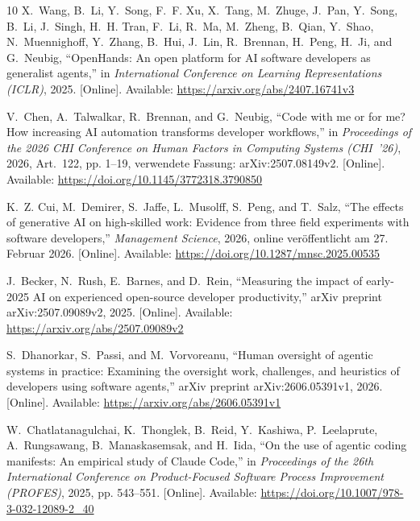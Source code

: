 \documentclass[conference]{IEEEtran}
\begin{document}
\begin{thebibliography}{10}
\BIBentryALTinterwordspacing
X.~Wang, B.~Li, Y.~Song, F.~F. Xu, X.~Tang, M.~Zhuge, J.~Pan, Y.~Song, B.~Li,
  J.~Singh, H.~H. Tran, F.~Li, R.~Ma, M.~Zheng, B.~Qian, Y.~Shao,
  N.~Muennighoff, Y.~Zhang, B.~Hui, J.~Lin, R.~Brennan, H.~Peng, H.~Ji, and
  G.~Neubig, ``{OpenHands}: An open platform for {AI} software developers as
  generalist agents,'' in \emph{International Conference on Learning
  Representations (ICLR)}, 2025. [Online]. Available:
  \url{https://arxiv.org/abs/2407.16741v3}
\BIBentrySTDinterwordspacing

\BIBentryALTinterwordspacing
V.~Chen, A.~Talwalkar, R.~Brennan, and G.~Neubig, ``Code with me or for me?
  {How} increasing {AI} automation transforms developer workflows,'' in
  \emph{Proceedings of the 2026 CHI Conference on Human Factors in Computing
  Systems (CHI~'26)}, 2026, Art.~122, pp. 1--19, verwendete Fassung:
  arXiv:2507.08149v2. [Online]. Available:
  \url{https://doi.org/10.1145/3772318.3790850}
\BIBentrySTDinterwordspacing

\BIBentryALTinterwordspacing
K.~Z. Cui, M.~Demirer, S.~Jaffe, L.~Musolff, S.~Peng, and T.~Salz, ``The
  effects of generative {AI} on high-skilled work: Evidence from three field
  experiments with software developers,'' \emph{Management Science}, 2026,
  online veröffentlicht am 27. Februar 2026. [Online]. Available:
  \url{https://doi.org/10.1287/mnsc.2025.00535}
\BIBentrySTDinterwordspacing

\BIBentryALTinterwordspacing
J.~Becker, N.~Rush, E.~Barnes, and D.~Rein, ``Measuring the impact of
  early-2025 {AI} on experienced open-source developer productivity,'' arXiv
  preprint arXiv:2507.09089v2, 2025. [Online]. Available:
  \url{https://arxiv.org/abs/2507.09089v2}
\BIBentrySTDinterwordspacing

\BIBentryALTinterwordspacing
S.~Dhanorkar, S.~Passi, and M.~Vorvoreanu, ``Human oversight of agentic systems
  in practice: Examining the oversight work, challenges, and heuristics of
  developers using software agents,'' arXiv preprint arXiv:2606.05391v1, 2026.
  [Online]. Available: \url{https://arxiv.org/abs/2606.05391v1}
\BIBentrySTDinterwordspacing

\BIBentryALTinterwordspacing
W.~Chatlatanagulchai, K.~Thonglek, B.~Reid, Y.~Kashiwa, P.~Leelaprute,
  A.~Rungsawang, B.~Manaskasemsak, and H.~Iida, ``On the use of agentic coding
  manifests: An empirical study of {Claude Code},'' in \emph{Proceedings of the
  26th International Conference on Product-Focused Software Process Improvement
  (PROFES)}, 2025, pp. 543--551. [Online]. Available:
  \url{https://doi.org/10.1007/978-3-032-12089-2_40}
\BIBentrySTDinterwordspacing


\end{thebibliography}
\end{document}
